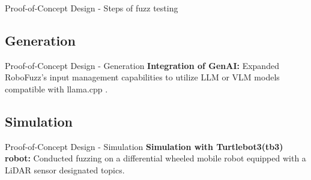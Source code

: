 \documentclass[aspectratio=169]{beamer}
\begin{document}

\begin{frame}{Proof-of-Concept Design - Steps of fuzz testing}

 

\end{frame}

\subsection{Generation}
\begin{frame}{Proof-of-Concept Design - Generation}
 \textbf{Integration of GenAI:} Expanded RoboFuzz's input management capabilities to utilize LLM or VLM models compatible with llama.cpp .
  
\end{frame}

\subsection{Simulation}
\begin{frame}{Proof-of-Concept Design - Simulation}
 \textbf{Simulation with Turtlebot3(tb3) robot:} Conducted fuzzing on a differential wheeled mobile robot equipped with a LiDAR sensor designated topics.




\end{frame}
\end{document}
